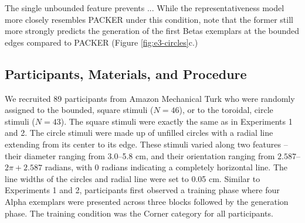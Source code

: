 \documentclass[12pt]{article}
\begin{document}
\begin{flushleft}
The single unbounded feature prevents ... While the representativeness model
more closely resembles PACKER under this condition, note that the former still
more strongly predicts the generation of the first Betas exemplars at the
bounded edges compared to PACKER (Figure \ref{fig:e3-circles}c.) 





\subsection{Participants, Materials, and Procedure}

We recruited 89 participants from Amazon Mechanical Turk who were randomly
assigned to the bounded, square stimuli ($N=46$), or to the toroidal, circle
stimuli ($N=43$). The square stimuli were exactly the same as in Experiments 1
and 2. The circle stimuli were made up of unfilled circles with a radial line
extending from its center to its edge. These stimuli varied along two features
-- their diameter ranging from 3.0--5.8 cm, and their orientation ranging from
$2.587$--$2\pi + 2.587$ radians, with $0$ radians indicating a completely
horizontal line. The line widths of the circles and radial line were set to 0.05
cm. Similar to Experiments 1 and 2, participants first observed a training phase
where four Alpha exemplars were presented across three blocks followed by the
generation phase. The training condition was the Corner category for all
participants.


\end{flushleft}
\end{document}
